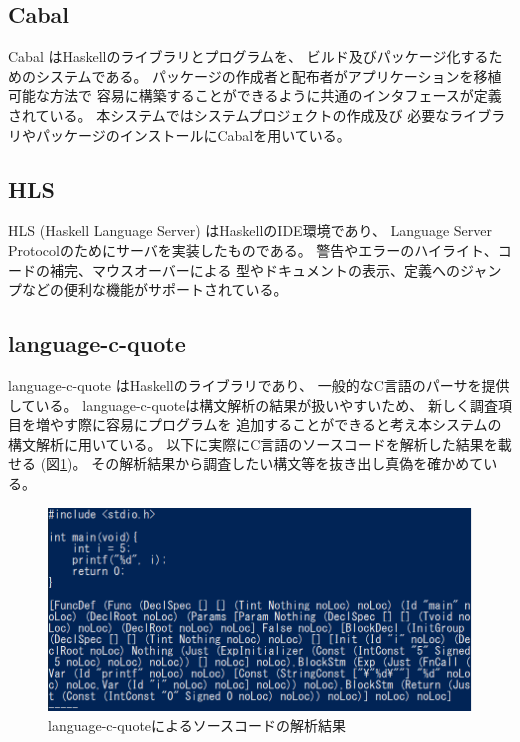 \documentclass{csspaper}
\begin{document}
      \subsection{Cabal}
      Cabal \cite{7}はHaskellのライブラリとプログラムを、
      ビルド及びパッケージ化するためのシステムである。
      パッケージの作成者と配布者がアプリケーションを移植可能な方法で
      容易に構築することができるように共通のインタフェースが定義されている。
      本システムではシステムプロジェクトの作成及び
      必要なライブラリやパッケージのインストールにCabalを用いている。

      \subsection{HLS}
      HLS (Haskell Language Server) \cite{8}はHaskellのIDE環境であり、
      Language Server Protocolのためにサーバを実装したものである。
      警告やエラーのハイライト、コードの補完、マウスオーバーによる
      型やドキュメントの表示、定義へのジャンプなどの便利な機能がサポートされている。

      \subsection{language-c-quote}
      language-c-quote \cite{9}はHaskellのライブラリであり、
      一般的なC言語のパーサを提供している。
      language-c-quoteは構文解析の結果が扱いやすいため、
      新しく調査項目を増やす際に容易にプログラムを
      追加することができると考え本システムの構文解析に用いている。
      以下に実際にC言語のソースコードを解析した結果を載せる (図\ref{fig:lcq})。
      その解析結果から調査したい構文等を抜き出し真偽を確かめている。

      \begin{figure}[h]
         \includegraphics[width=15cm]{lcq.png}
         \caption{language-c-quoteによるソースコードの解析結果}
         \label{fig:lcq}
      \end{figure}
\end{document}
